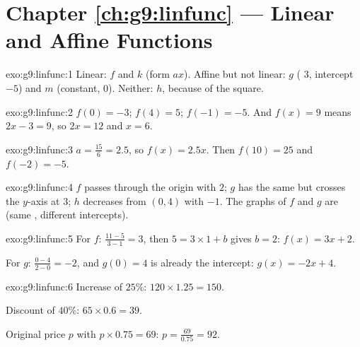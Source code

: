 \section*{Chapter \ref{ch:g9:linfunc} --- Linear and Affine Functions}

\begin{solution}{exo:g9:linfunc:1}
Linear: $f$ and $k$ (form $ax$). Affine but not linear: $g$ ( $3$,
intercept $-5$) and $m$ (constant,  $0$). Neither: $h$, because of
the square.
\end{solution}

\begin{solution}{exo:g9:linfunc:2}
$f(0) = -3$; $f(4) = 5$; $f(-1) = -5$. And $f(x) = 9$ means
$2x - 3 = 9$, so $2x = 12$ and $x = 6$.
\end{solution}

\begin{solution}{exo:g9:linfunc:3}
$a = \frac{15}{6} = 2.5$, so $f(x) = 2.5x$. Then $f(10) = 25$ and
$f(-2) = -5$.
\end{solution}

\begin{solution}{exo:g9:linfunc:4}
$f$ passes through the origin with  $2$; $g$ has the same  but
crosses the $y$-axis at $3$; $h$ decreases from $(0, 4)$ with 
$-1$. The graphs of $f$ and $g$ are \emph{} (same ,
different intercepts).
\end{solution}

\begin{solution}{exo:g9:linfunc:5}
For $f$:  $\frac{11 - 5}{3 - 1} = 3$, then $5 = 3 \times 1 + b$
gives $b = 2$: $f(x) = 3x + 2$.

For $g$:  $\frac{0 - 4}{2 - 0} = -2$, and $g(0) = 4$ is already the
intercept: $g(x) = -2x + 4$.
\end{solution}

\begin{solution}{exo:g9:linfunc:6}
Increase of $25\%$: $120 \times 1.25 = 150$.

Discount of $40\%$: $65 \times 0.6 = 39$.

Original price $p$ with $p \times 0.75 = 69$:
$p = \frac{69}{0.75} = 92$.
\end{solution}

